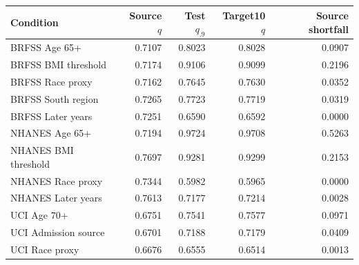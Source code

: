 \begin{tabular}{lrrrr}
\toprule
Condition & Source $q$ & Test $q_{.9}$ & Target10 $q$ & Source shortfall \\
\midrule
BRFSS Age 65+ & 0.7107 & 0.8023 & 0.8028 & 0.0907 \\
BRFSS BMI threshold & 0.7174 & 0.9106 & 0.9099 & 0.2196 \\
BRFSS Race proxy & 0.7162 & 0.7645 & 0.7630 & 0.0352 \\
BRFSS South region & 0.7265 & 0.7723 & 0.7719 & 0.0319 \\
BRFSS Later years & 0.7251 & 0.6590 & 0.6592 & 0.0000 \\
NHANES Age 65+ & 0.7194 & 0.9724 & 0.9708 & 0.5263 \\
NHANES BMI threshold & 0.7697 & 0.9281 & 0.9299 & 0.2153 \\
NHANES Race proxy & 0.7344 & 0.5982 & 0.5965 & 0.0000 \\
NHANES Later years & 0.7613 & 0.7177 & 0.7214 & 0.0028 \\
UCI Age 70+ & 0.6751 & 0.7541 & 0.7577 & 0.0971 \\
UCI Admission source & 0.6701 & 0.7188 & 0.7179 & 0.0409 \\
UCI Race proxy & 0.6676 & 0.6555 & 0.6514 & 0.0013 \\
\bottomrule
\end{tabular}
